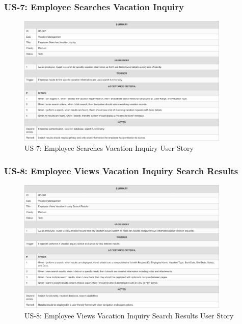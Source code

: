 \documentclass[12pt,a4paper]{article}
\begin{document}
\subsubsection{US-7: Employee Searches Vacation Inquiry}
\begin{figure}[H]
\centering
\includegraphics[width=0.9\textwidth]{User-Stories/US-7-Employee-Searches-Vacation-Inquiry/US-7-Employee-Searches-Vacation-Inquiry-1.png}
\caption{US-7: Employee Searches Vacation Inquiry User Story}
\label{fig:us7}
\end{figure}

\subsubsection{US-8: Employee Views Vacation Inquiry Search Results}
\begin{figure}[H]
\centering
\includegraphics[width=0.9\textwidth]{User-Stories/US-8-Employee-Views-Vacation-Inquiry-Search-Results/US-8-Employee-Views-Vacation-Inquiry-Search-Results-1.png}
\caption{US-8: Employee Views Vacation Inquiry Search Results User Story}
\label{fig:us8}
\end{figure}
\end{document}
